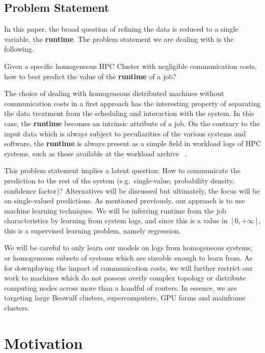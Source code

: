 \documentclass{article}
\begin{document}
\subsection{Problem Statement}
In this paper, the broad question of refining the data is reduced to a single variable, the \textbf{runtime}. The problem statement we are dealing with is the following.

Given a specific homogeneous HPC Cluster with negligible communication costs, how to best predict the value of the \textbf{runtime} of a job?

The choice of dealing with homogeneous distributed machines without communication costs in a first approach has the interesting property of separating the data treatment from the scheduling and interaction with the system.
In this case, the \textbf{runtime} becomes an intrinsic attribute of a job.
On the contrary to the input data which is always subject to peculiarities of the various systems and software, the \textbf{runtime} is always present as a simple field in workload logs of HPC systems, such as those available at the workload archive ~\cite{workloadarchive}.

This problem statement implies a latent question: How to communicate the prediction to the rest of the system (e.g.\ single-value, probability density, confidence factor)? Alternatives will be discussed but ultimately, the focus will be on single-valued predictions.
As mentioned previously, our approach is to use machine learning techniques. We will be inferring runtime from the job characteristics by learning from system logs, and since this is a value in $[0,+\infty ]$, this is a supervised learning problem, namely regression.

We will be careful to only learn our models on logs from homogeneous systems, or homogeneous subsets of systems which are sizeable enough to learn from.
As for downplaying the impact of communication costs, we will further restrict our work to machines which do not possess overly complex topology or distribute computing nodes across more than a handful of routers.
In essence, we are targeting large Beowulf clusters, supercomputers, GPU farms and mainframe clusters.

\section{Motivation}
\end{document}
